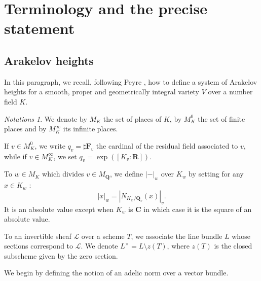 \documentclass{proc-l}
\newcommand{\R}{\mathbf{R}}
\newcommand{\C}{\mathbf{C}}
\newcommand{\Q}{\mathbf{Q}}
\newcommand{\F}{\mathbf{F}}
\newcommand{\G}{\mathbf{G}}
\newcommand{\sheafL}{\mathcal{L}}
\theoremstyle{definition}
\theoremstyle{remark}
\newtheorem*{Notations}{Notations}
\numberwithin{equation}{section}
\begin{document}
\section{Terminology and the precise statement}

\subsection{Arakelov heights}

In this paragraph, we recall,  following Peyre \cite{Peyre_beyond_height}, how to define a system of Arakelov heights for a smooth, proper and geometrically integral variety $V$ over a number field $K$.

\begin{Notations}
    We denote by $M_K$ the set of places of $K$, by $M_K^0$ the set of finite places and by $M_K^{\infty}$ its infinite places.

    If $v \in M_K^0$, we write $q_v = \sharp \F_v$ the cardinal of the residual field associated to $v$, while if $v \in M_K^{\infty}$, we set $q_v = \exp([K_v:\R])$.

    To $w \in M_K$ which divides $v \in M_{\Q}$, we define $|-|_w $ over $K_w$ by setting for any $x \in K_w$ :
    $$ | x |_w = | N_{K_w/\Q_v}(x) |_v .$$It is an absolute value except when $K_w$ is $\C$ in which case it is the square of an absolute value.

    To an invertible sheaf $\sheafL$ over a scheme $T$, we associate the line bundle $L$ whose sections correspond to $\sheafL$. 
    We denote $L^{\times} = L \setminus z(T)$, where $z(T)$ is the closed subscheme given by the zero section. %
\end{Notations}

We begin by defining the notion of an adelic norm over a vector bundle.
\end{document}
